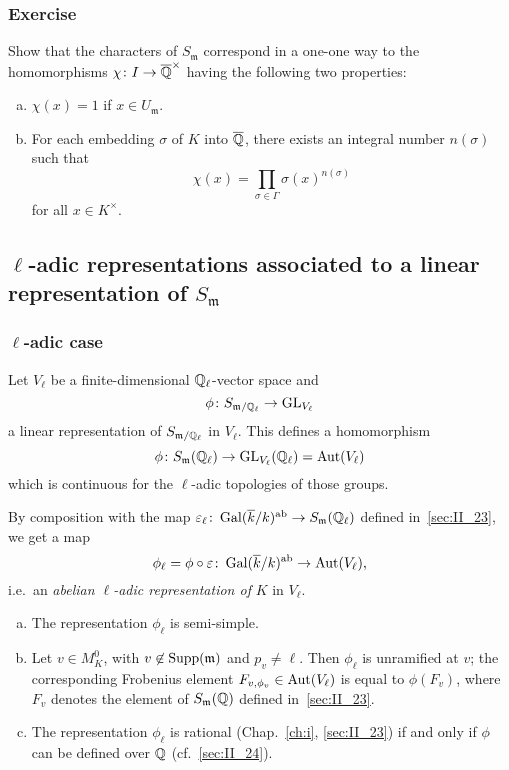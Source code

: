 \subsubsection*{Exercise}
Show that the characters of $S_{\mathfrak{m}}$ correspond in a one-one way to
the homomorphisms $\chi \colon I \to \overline{\mathbb{Q}}^\times$ having the following
two properties:
\begin{enumerate}[(a)]
\item $\chi(x) = 1$ if $x \in U_{\mathfrak{m}}$.
\item For each embedding $\sigma$ of $K$ into $\overline{\mathbb{Q}}$, there exists an
	integral number $n(\sigma)$ such that
	\[
		\chi(x) = \prod_{\sigma \in \Gamma} \sigma(x)^{n(\sigma)}
	\]
	for all $x \in K^\times$.
\end{enumerate}

\subsection{\texorpdfstring{$\ell$}{ℓ}-adic representations associated to a
linear representation of \texorpdfstring{$S_{\mathfrak{m}}$}{Sm}}
\label{sec:II_25}
\dpage

\subsubsection{\texorpdfstring{$\ell$}{ℓ}-adic case}
\label{sec:II_25_1}

Let $V_\ell$ be a finite-dimensional $\mathbb{Q}_\ell$-vector space and
\[
	\phi \colon S_{\mathfrak{m} / \mathbb{Q}_\ell} \rightarrow \operatorname{GL}_{V_\ell}
\]
a linear representation of $S_{\mathfrak{m} / \mathbb{Q}_\ell}$ in $V_\ell$. This 
defines a homomorphism
\[
	\phi \colon S_\mathfrak{m}(\mathbb{Q}_\ell) \rightarrow \operatorname{GL}_{V_\ell}(\mathbb{Q}_\ell) = 
	\operatorname{Aut}(V_\ell)
\]
which is continuous for the $\ell$-adic topologies of those groups.

By composition with the map $\varepsilon_\ell \colon \operatorname{Gal}(\overline{k}/k)^{\mathrm{ab}}
\to S_{\mathfrak{m}} (\mathbb{Q}_\ell)$ defined in~\ref{sec:II_23}, we get a map
\[
	\phi_\ell = \phi \circ \varepsilon \colon \operatorname{Gal}(\overline{k}/k)^{\mathrm{ab}} \to
	\operatorname{Aut}(V_\ell),
\]
i.e.\ an \emph{abelian $\ell$-adic representation of} $K$ in $V_\ell$.

\begin{prop}
\begin{enumerate}[a), series=prII_25_1]
\item\label{prop:II_25_a}
	The representation $\phi_\ell$ is semi-simple.
\item\label{prop:II_25_b}
	Let $v \in M_K^0$, with $v \not\in \operatorname{Supp}(\mathfrak{m})$ and $p_v \neq 
	\ell$.
	Then $\phi_\ell$ is unramified at $v$; the corresponding Frobenius element 
	$F_{v, \phi_v} \in \operatorname{Aut}(V_\ell)$ is equal to $\phi(F_v)$, where $F_v$ denotes 
	the element of $S_\mathfrak{m}(\mathbb{Q})$ defined in~\ref{sec:II_23}.
	\dpage
\item\label{prop:II_25_c}
	The representation $\phi_\ell$ is rational (Chap.~\ref{ch:i},
	\ref{sec:II_23}) if and only if $\phi$ can be defined over $\mathbb{Q}$
	(cf.\ \ref{sec:II_24}).
\end{enumerate}
\end{prop}

